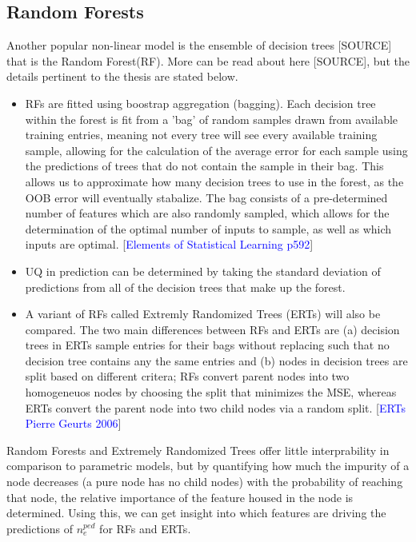\documentclass[a4paper, twoside, final, 12pt]{article}
\begin{document}
\subsection{Random Forests}
Another popular non-linear model is the ensemble of decision trees [SOURCE] that is the Random Forest(RF). More can be read about here [SOURCE], but the details pertinent to the thesis are stated below.
\begin{itemize}
	\item RFs are fitted using boostrap aggregation (bagging). Each decision tree within the forest is fit from a 'bag' of random samples drawn from available training entries, meaning not every tree will see every available training sample, allowing for the calculation of the average error for each sample using the predictions of trees that do not contain the sample in their bag. This allows us to approximate how many decision trees to use in the forest, as the OOB error will eventually stabalize. The bag consists of a pre-determined number of features which are also randomly sampled, which allows for the determination of the optimal number of inputs to sample, as well as which inputs are optimal.  [\textcolor{blue}{Elements of Statistical Learning p592}]
	\item UQ in prediction can be determined by taking the standard deviation of predictions from all of the decision trees that make up the forest. 
	\item A variant of RFs called Extremly Randomized Trees (ERTs) will also be compared. The two main differences between RFs and ERTs are (a) decision trees in ERTs sample entries for their bags without replacing such that no decision tree contains any the same entries and (b) nodes in decision trees are split based on different critera; RFs convert parent nodes into two homogeneuos nodes by choosing the split that minimizes the MSE, whereas ERTs convert the parent node into two child nodes via a random split. [\textcolor{blue}{ERTs Pierre Geurts 2006}]
\end{itemize}

Random Forests and Extremely Randomized Trees offer little interprability in comparison to parametric models, but by quantifying how much the impurity of a node decreases (a pure node has no child nodes) with the probability of reaching that node, the relative importance of the feature housed in the node is determined. Using this, we can get insight into which features are driving the predictions of $n_e^{ped}$ for RFs and ERTs. 
\end{document}
